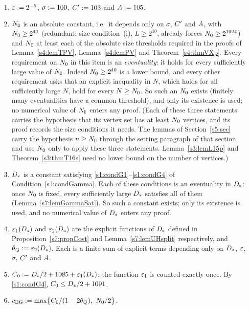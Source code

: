 \begin{definition}\label{s1:defConstants}
\begin{enumerate}
\item[(i)] $\varepsilon\mathrel{:=}2^{-5}$, $\sigma\mathrel{:=}100$, $C'\mathrel{:=}103$ and
$A\mathrel{:=}105$.
\item[(ii)] $N_{0}$ is an absolute constant, i.e.\ it depends only on $\sigma$,
$C'$ and $A$, with $N_{0}\ge2^{40}$ (redundant: size condition~(i),
$L\ge2^{10}$, already forces $N_{0}\ge2^{1024}$) and $N_{0}$ at least
each of the absolute size thresholds required in the proofs of
Lemma~\ref{s4:lemTPV}, Lemma~\ref{s4:lemPV} and Theorem~\ref{s4:thmVXp}.
Every requirement on $N_{0}$ in this item is an \emph{eventuality}: it holds
for every sufficiently large value of $N_{0}$. Indeed $N_{0}\ge2^{40}$ is a
lower bound, and every other requirement asks that an explicit inequality in
$N$, which holds for all sufficiently large $N$, hold for every $N\ge N_{0}$. So
such an $N_{0}$ exists (finitely many eventualities have a common threshold),
and only its existence is used; no numerical value of $N_{0}$ enters any proof.
(Each of these three statements carries the hypothesis that its vertex set has
at least $N_{0}$ vertices, and its proof records the size conditions it
needs. The lemmas of Section~\ref{s5:sec} carry the hypothesis $n\ge N_{0}$
through the setting paragraph of that section and use $N_{0}$ only to apply
these three statements. Lemma~\ref{s3:lemL15p} and Theorem~\ref{s3:thmT16s}
need no lower bound on the number of vertices.)
\item[(iii)] $D_{*}$ is a constant satisfying \ref{s1:condG1}--\ref{s1:condG4}
of Condition~\ref{s1:condGamma}. Each of these conditions is an eventuality in
$D_{*}$: once $N_{0}$ is fixed, every sufficiently large $D_{*}$ satisfies all
of them (Lemma~\ref{s7:lemGammaSat}). So such a constant exists; only its
existence is used, and no numerical value of $D_{*}$ enters any proof.
\item[(iv)] $\varepsilon_{1}(D_{*})$ and $\varepsilon_{2}(D_{*})$ are the explicit functions
of $D_{*}$ defined in Proposition~\ref{s7:propCost} and
Lemma~\ref{s7:lemUHsplit} respectively, and $\theta_{Q}\mathrel{:=}\varepsilon_{2}(D_{*})$. Each is a finite sum of explicit terms
depending only on $D_{*}$, $\varepsilon$, $\sigma$, $C'$ and $A$.
\item[(v)] $C_{0}\mathrel{:=}D_{*}/2+1085+\varepsilon_{1}(D_{*})$; the function
$\varepsilon_{1}$ is counted exactly once. By \ref{s1:condG4},
$C_{0}\le D_{*}/2+1091$.
\item[(vi)] $\cEG\defeq\max\bigl\{\Czero/(1-2\thetaQ),\ \Nzero/2\bigr\}$.

\end{enumerate}
\end{definition}
